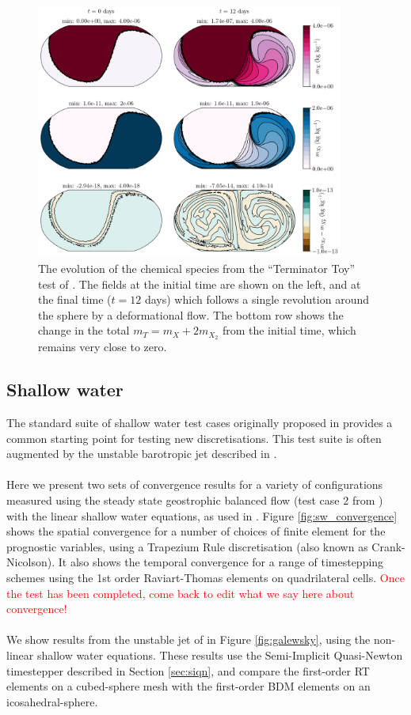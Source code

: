 \documentclass[journal abbreviation, manuscript]{copernicus}
\begin{document}
\begin{figure}[htp!]
\centering
\includegraphics[width=0.9\textwidth]{figures/terminator_toy.png}
\caption{The evolution of the chemical species from the ``Terminator Toy'' test of \citet{lauritzen2015terminator}.
The fields at the initial time are shown on the left, and at the final time ($t=12$ days) which follows a single revolution around the sphere by a deformational flow.
The bottom row shows the change in the total $m_T=m_X+2m_{X_2}$ from the initial time, which remains very close to zero.}
\label{fig:terminator}
\end{figure}

\subsection{Shallow water}
The standard suite of shallow water test cases originally proposed in
\citet{williamson1992standard} provides a common starting point for
testing new discretisations. This test suite is often augmented by
the unstable barotropic jet described in
\citet{galewsky2004initial}. \\
\\
Here we present two sets of convergence results for a variety of configurations measured using the steady state geostrophic balanced flow (test case 2 from
\citet{williamson1992standard}) with the linear shallow water equations, as used in \citet{weller2012computational}.
Figure \ref{fig:sw_convergence} shows the spatial convergence for a number of choices of finite element for the prognostic variables, using a Trapezium Rule discretisation (also known as Crank-Nicolson).
It also shows the temporal convergence for a range of timestepping schemes using the 1st order Raviart-Thomas elements on quadrilateral cells. 
\textcolor{red}{Once the test has been completed, come back to edit what we say here about convergence!} \\
\\
We show results from the unstable jet of \citet{galewsky2004initial} in Figure \ref{fig:galewsky}, using the non-linear shallow water equations.
These results use the Semi-Implicit Quasi-Newton timestepper described in Section \ref{sec:siqn}, and compare the first-order RT elements on a cubed-sphere mesh with the first-order BDM elements on an icosahedral-sphere.
\end{document}
